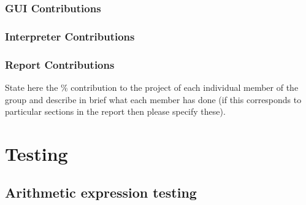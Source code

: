\documentclass[a4paper, oneside, 11pt]{report}
\begin{document}
    \subsection{GUI Contributions}
    \subsection{Interpreter Contributions}
    \subsection{Report Contributions}

    State here the \% contribution to the project of each individual member of the group and describe in brief what each member has done (if this corresponds to particular sections in the report then please specify these).

    \chapter{Testing}
    \label{app:test}
    \section{Arithmetic expression testing}
\end{document}
